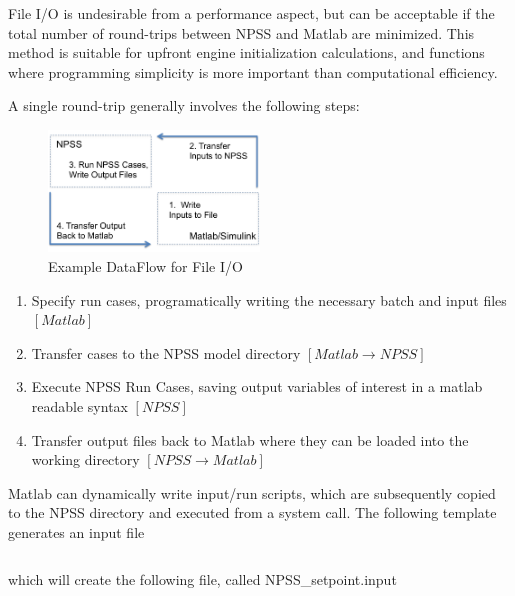 \documentclass[heading.tex]{subfiles}
\begin{document}
File I/O is undesirable from a performance aspect, but can be acceptable if the total number of round-trips between
NPSS and Matlab are minimized. This method is suitable for upfront engine initialization calculations, 
and functions where programming simplicity is more important than computational efficiency.

A single round-trip generally involves the following steps:

\begin{figure}[H]
\centering
\includegraphics[width=0.5\textwidth]{images/roundTrip}
\caption{Example DataFlow for File I/O}
\label{f:DialogBox}
\end{figure}

\begin{enumerate}
  \item Specify run cases, programatically writing the necessary batch and input files $[Matlab]$
  \item Transfer cases to the NPSS model directory $[Matlab \rightarrow NPSS]$
  \item Execute NPSS Run Cases, saving output variables of interest in a matlab readable syntax $[NPSS]$
  \item Transfer output files back to Matlab where they can be loaded into the working directory $[NPSS \rightarrow Matlab]$
\end{enumerate}


Matlab can dynamically write input/run scripts, which are subsequently
copied to the NPSS directory and executed from a system call.
The following template generates an input file

 \begin{adjustwidth}{-1cm}{-1cm}
 \inputminted[]{matlab}{code/dlmwrite.m}
 \end{adjustwidth} 

which will create the following file, called NPSS_setpoint.input

 \begin{adjustwidth}{-1cm}{-1cm}
 \inputminted[]{matlab}{code/dlmOutput.m}
 \end{adjustwidth} 
\end{document}
